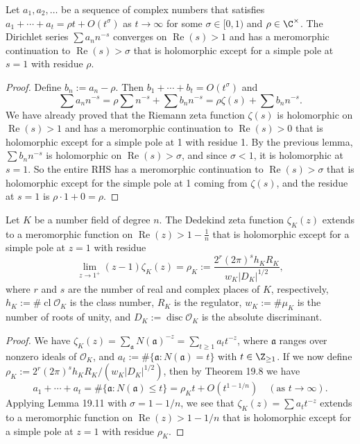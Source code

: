 \begin{lemma}[19.11]
Let $a_1,a_2,\ldots$ be a sequence of complex numbers that satisfies $a_1+\cdots+a_t=\rho t+O(t^\sigma)$ as $t\to\infty$ for some $\sigma\in[0,1)$ and $\rho\in\C^\times$. The Dirichlet series $\sum a_nn^{-s}$ converges on $\operatorname{Re}(s)>1$ and has a meromorphic continuation to $\operatorname{Re}(s)>\sigma$ that is holomorphic except for a simple pole at $s=1$ with residue $\rho$.
\end{lemma}
\begin{proof}
Define $b_n:=a_n-\rho$. Then $b_1+\cdots+b_t=O(t^\sigma)$ and
\[
\sum a_nn^{-s}=\rho\sum n^{-s}+\sum b_nn^{-s}=\rho\zeta(s)+\sum b_nn^{-s}.
\]
We have already proved that the Riemann zeta function $\zeta(s)$ is holomorphic on $\operatorname{Re}(s)>1$ and has a meromorphic continuation to $\operatorname{Re}(s)>0$ that is holomorphic except for a simple pole at 1 with residue 1. By the previous lemma, $\sum b_nn^{-s}$ is holomorphic on $\operatorname{Re}(s)>\sigma$, and since $\sigma<1$, it is holomorphic at $s=1$. So the entire RHS has a meromorphic continuation to $\operatorname{Re}(s)>\sigma$ that is holomorphic except for the simple pole at 1 coming from $\zeta(s)$, and the residue at $s=1$ is $\rho\cdot1+0=\rho$.
\end{proof}
\begin{theorem}
Let $K$ be a number field of degree $n$. The Dedekind zeta function $\zeta_K(z)$ extends to a meromorphic function on $\operatorname{Re}(z)>1-\frac1n$ that is holomorphic except for a simple pole at $z=1$ with residue
\[
\lim_{z\to1^+}(z-1)\zeta_K(z)=\rho_K:=\frac{2^r(2\pi)^sh_KR_K}{w_K|D_K|^{1/2}},
\]
where $r$ and $s$ are the number of real and complex places of $K$, respectively, $h_K:=\#\operatorname{cl}\mathcal O_K$ is the class number, $R_K$ is the regulator, $w_K:=\#\mu_K$ is the number of roots of unity, and $D_K:=\operatorname{disc}\mathcal O_K$ is the absolute discriminant.
\end{theorem}
\begin{proof}
We have $\zeta_K(z)=\sum_{\mathfrak a}N(\mathfrak a)^{-z}=\sum_{t\geq1}a_tt^{-z}$, where $\mathfrak a$ ranges over nonzero ideals of $\mathcal O_K$, and $a_t:=\#\{\mathfrak a:N(\mathfrak a)=t\}$ with $t\in\Z_{\geq1}$. If we now define $\rho_K:=2^r(2\pi)^sh_KR_K/(w_K|D_K|^{1/2})$, then by Theorem 19.8 we have
\[
a_1+\cdots+a_t=\#\{\mathfrak a:N(\mathfrak a)\leq t\}=\rho_Kt+O(t^{1-1/n})\quad(\text{as }t\to\infty).
\]
Applying Lemma 19.11 with $\sigma=1-1/n$, we see that $\zeta_K(z)=\sum a_tt^{-z}$ extends to a meromorphic function on $\operatorname{Re}(z)>1-1/n$ that is holomorphic except for a simple pole at $z=1$ with residue $\rho_K$.
\end{proof}